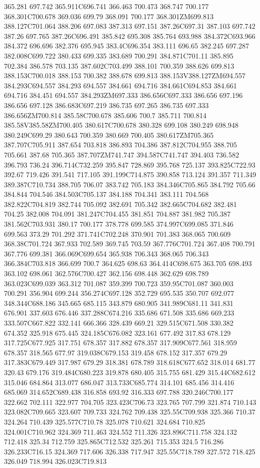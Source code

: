 365.281 697.742 365.911C696.741 366.463 700.473 368.747 700.177 368.301C700.678 369.036 699.79 368.091 700.177 368.301ZM699.813 388.127C701.064 388.206 697.083 387.313 697.151 387.26C697.31 387.103 697.742 387.26 697.765 387.26C696.491 385.842 695.308 385.764 693.988 384.372C693.966 384.372 696.696 382.376 695.945 383.4C696.354 383.111 696.65 382.245 697.287 382.008C699.722 380.433 699.335 383.689 700.291 384.871C701.11 385.895 702.384 386.578 703.135 387.602C703.499 388.101 700.359 388.626 699.813 388.153C700.018 388.153 700.382 388.678 699.813 388.153V388.127ZM694.557 384.293C694.557 384.293 694.557 384.661 694.716 384.661C694.853 384.661 694.716 384.451 694.557 384.293ZM697.333 386.656C697.333 386.656 697.196 386.656 697.128 386.683C697.219 386.735 697.265 386.735 697.333 386.656ZM700.814 385.58C700.678 385.606 700.7 385.711 700.814 385.58V385.58ZM700.405 380.617C700.678 380.328 699.108 380.249 698.948 380.249C699.29 380.643 700.359 380.669 700.405 380.617ZM705.365 387.707C705.911 387.654 703.818 386.893 704.386 387.812C704.955 388.705 705.661 387.68 705.365 387.707ZM741.747 394.587C741.747 394.403 736.582 396.793 736.24 396.714C732.259 395.847 728.869 395.768 725.137 393.825C722.93 392.67 719.426 391.541 717.105 391.199C714.875 390.858 713.124 391.357 711.349 389.387C710.734 388.705 706.07 383.742 705.183 384.346C705.865 384.792 705.66 384.844 704.546 384.503C705.137 384.188 704.341 383.111 704.568 382.822C704.819 382.744 705.092 382.691 705.342 382.665C704.682 382.481 704.25 382.008 704.091 381.247C704.455 381.851 704.887 381.982 705.387 381.562C703.931 380.17 700.177 378.778 699.585 374.997C699.085 371.846 699.563 373.29 701.292 371.741C702.248 370.901 701.383 368.065 700.609 368.38C701.724 367.933 702.589 369.745 703.59 367.776C701.724 367.408 700.791 367.776 699.381 366.069C699.654 365.938 706.343 368.065 706.343 366.384C703.818 366.699 700.7 364.625 698.63 364.414C698.675 363.705 698.493 363.102 698.061 362.576C700.427 362.156 698.448 362.629 698.789 363.023C699.039 363.312 701.087 359.399 700.723 359.95C701.087 360.003 700.291 356.904 699.244 356.274C697.128 352.729 695.535 350.707 692.077 348.344C688.186 345.665 685.115 343.879 680.905 341.989C681.11 341.831 676.901 337.603 676.446 337.288C674.216 335.686 671.508 335.686 669.233 333.507C667.822 332.141 666.366 328.439 669.21 329.515C671.508 330.382 674.352 325.918 675.445 324.185C676.082 323.161 677.492 317.83 678.129 317.725C677.925 317.751 678.357 317.882 678.357 317.909C677.561 318.959 678.357 318.565 677.97 319.038C679.153 319.458 678.152 317.357 679.29 317.383C679.449 317.987 679.29 318.381 678.789 318.618C677.652 318.014 681.77 320.43 679.176 319.484C680.223 319.878 680.405 315.755 681.429 315.44C682.612 315.046 684.864 313.077 686.047 313.733C685.774 314.101 685.456 314.416 685.069 314.652C689.438 316.858 693.92 316.333 697.788 320.246C700.177 322.662 702.111 322.977 704.705 323.423C706.73 323.765 707.799 321.874 710.143 323.082C709.665 323.607 709.733 324.762 709.438 325.55C709.938 325.366 710.37 324.264 710.439 325.577C710.78 325.078 710.621 324.684 710.825 324.001C710.962 324.369 711.463 324.552 711.326 323.896C711.758 324.132 712.418 325.34 712.759 325.865C712.532 325.261 715.353 324.5 716.286 326.233C716.15 324.369 717.606 326.338 717.947 325.55C718.789 327.572 718.425 326.049 718.994 326.023C719.813 